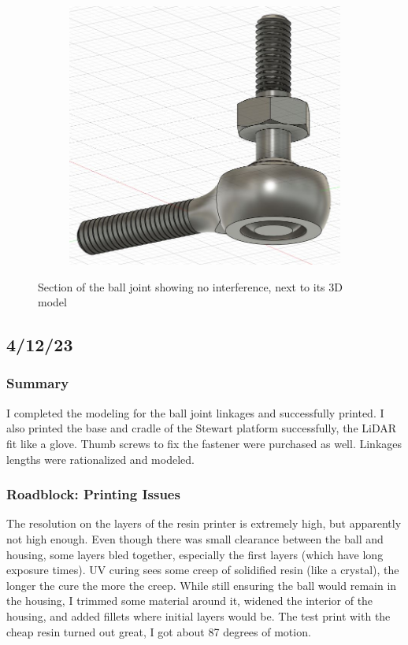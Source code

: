 \documentclass[a4paper, 10pt]{article}
\begin{document}
\begin{figure}[h]
\begin{subfigure}[h]{0.34\textwidth}
			\end{subfigure}
			\hfill
			\begin{subfigure}[h]{0.65\textwidth}
				\centering
				\includegraphics[width=\textwidth]{ball_joint}
			\end{subfigure}
			\centering
			\caption{Section of the ball joint showing no interference, next to its 3D model}
			\label{ball_joint}
		\end{figure}
		
	\subsection{4/12/23}
		\subsubsection{Summary}
		I completed the modeling for the ball joint linkages and successfully printed. I also printed the base and cradle of the Stewart platform successfully, the LiDAR fit like a glove. Thumb screws to fix the fastener were purchased as well. Linkages lengths were rationalized and modeled. 
		
		\subsubsection{Roadblock: Printing Issues}
		The resolution on the layers of the resin printer is extremely high, but apparently not high enough. Even though there was small clearance between the ball and housing, some layers bled together, especially the first layers (which have long exposure times). UV curing sees some creep of solidified resin (like a crystal), the longer the cure the more the creep. While still ensuring the ball would remain in the housing, I trimmed some material around it, widened the interior of the housing, and added fillets where initial layers would be. The test print with the cheap resin turned out great, I got about 87 degrees of motion. 
		
\end{document}
